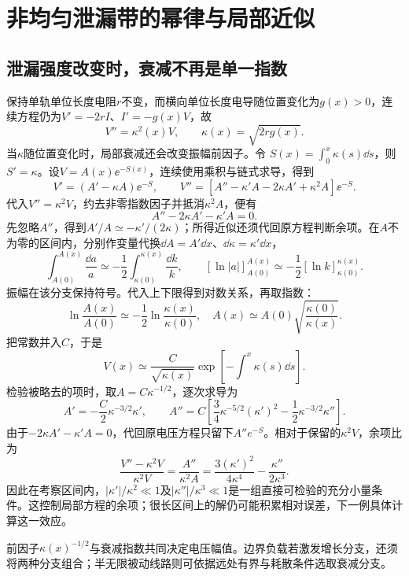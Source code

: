 \section{非均匀泄漏带的幂律与局部近似}
\subsection{泄漏强度改变时，衰减不再是单一指数}
保持单轨单位长度电阻$r$不变，而横向单位长度电导随位置变化为$g(x)>0$，连续方程仍为$V'=-2rI$、$I'=-g(x)V$，故
\[
 V''=\kappa^2(x)V,\qquad\kappa(x)=\sqrt{2rg(x)}.
\]
当$\kappa$随位置变化时，局部衰减还会改变振幅前因子。令
$S(x)=\int_0^x\kappa(s)\dd s$，则$S'=\kappa$。设$V=A(x)\ee^{-S(x)}$，连续使用乘积与链式求导，得到
\[
 V'=(A'-\kappa A)\ee^{-S},\qquad
 V''=[A''-\kappa'A-2\kappa A'+\kappa^2A]\ee^{-S}.
\]
代入$V''=\kappa^2V$，约去非零指数因子并抵消$\kappa^2A$，便有
\[
 A''-2\kappa A'-\kappa'A=0.
\]
先忽略$A''$，得到$A'/A\simeq-\kappa'/(2\kappa)$；所得近似还须代回原方程判断余项。在$A$不为零的区间内，分别作变量代换$\dd A=A'\dd x$、$\dd\kappa=\kappa'\dd x$，
\[\int_{A(0)}^{A(x)}\frac{\dd a}{a}
\simeq-\frac12\int_{\kappa(0)}^{\kappa(x)}\frac{\dd k}{k},\qquad
[\ln|a|]_{A(0)}^{A(x)}\simeq-\frac12[\ln k]_{\kappa(0)}^{\kappa(x)}.\]
振幅在该分支保持符号。代入上下限得到对数关系，再取指数：
\[
 \ln\frac{A(x)}{A(0)}\simeq-\frac12\ln\frac{\kappa(x)}{\kappa(0)},
 \quad A(x)\simeq A(0)\sqrt{\frac{\kappa(0)}{\kappa(x)}}.
\]
把常数并入$C$，于是
\[
 V(x)\simeq\frac{C}{\sqrt{\kappa(x)}}
 \exp\!\left[-\int^x\kappa(s)\dd s\right].
\]
检验被略去的项时，取$A=C\kappa^{-1/2}$，逐次求导为
\[
 A'=-\frac C2\kappa^{-3/2}\kappa',\qquad
 A''=C\left[\frac34\kappa^{-5/2}(\kappa')^2
 -\frac12\kappa^{-3/2}\kappa''\right].
\]
由于$-2\kappa A'-\kappa'A=0$，代回原电压方程只留下$A''e^{-S}$。相对于保留的$\kappa^2V$，余项比为
\[
 \frac{V''-\kappa^2V}{\kappa^2V}
 =\frac{A''}{\kappa^2A}
 =\frac{3(\kappa')^2}{4\kappa^4}-\frac{\kappa''}{2\kappa^3}.
\]
因此在考察区间内，$|\kappa'|/\kappa^2\ll1$及$|\kappa''|/\kappa^3\ll1$是一组直接可检验的充分小量条件。这控制局部方程的余项；很长区间上的解仍可能积累相对误差，下一例具体计算这一效应。

前因子$\kappa(x)^{-1/2}$与衰减指数共同决定电压幅值。边界负载若激发增长分支，还须将两种分支组合；半无限被动线路则可依据远处有界与耗散条件选取衰减分支。

